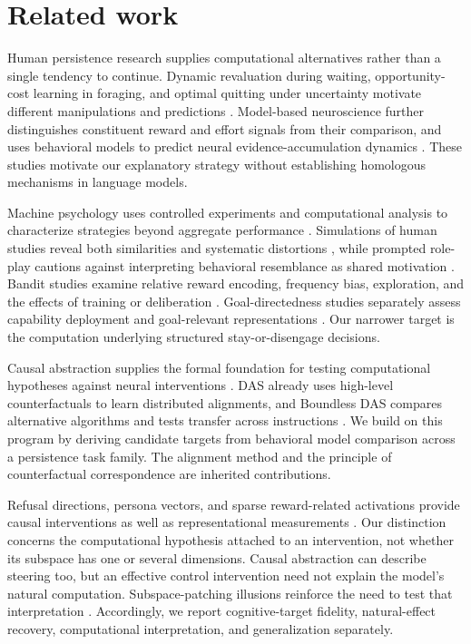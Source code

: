 \documentclass{article}
\begin{document}
\section{Related work}
Human persistence research supplies computational alternatives rather than a single tendency to continue. Dynamic revaluation during waiting, opportunity-cost learning in foraging, and optimal quitting under uncertainty motivate different manipulations and predictions \citep{mcguire2015persistence,constantino2015foraging,sukhov2025quitting}. Model-based neuroscience further distinguishes constituent reward and effort signals from their comparison, and uses behavioral models to predict neural evidence-accumulation dynamics \citep{klein2016comparison,pisauro2017evidence}. These studies motivate our explanatory strategy without establishing homologous mechanisms in language models.

Machine psychology uses controlled experiments and computational analysis to characterize strategies beyond aggregate performance \citep{hagendorff2024machine,binz2023psychology}. Simulations of human studies reveal both similarities and systematic distortions \citep{aher2023simulate}, while prompted role-play cautions against interpreting behavioral resemblance as shared motivation \citep{shanahan2023roleplay}. Bandit studies examine relative reward encoding, frequency bias, exploration, and the effects of training or deliberation \citep{hayes2024biased,schmied2025greedy,chen2025greedy,zhang2026exploration}. Goal-directedness studies separately assess capability deployment and goal-relevant representations \citep{everitt2025goals,arghal2026goals}. Our narrower target is the computation underlying structured stay-or-disengage decisions.

Causal abstraction supplies the formal foundation for testing computational hypotheses against neural interventions \citep{geiger2025foundation}. DAS already uses high-level counterfactuals to learn distributed alignments, and Boundless DAS compares alternative algorithms and tests transfer across instructions \citep{geiger2024alignments,wu2023scale}. We build on this program by deriving candidate targets from behavioral model comparison across a persistence task family. The alignment method and the principle of counterfactual correspondence are inherited contributions.

Refusal directions, persona vectors, and sparse reward-related activations provide causal interventions as well as representational measurements \citep{arditi2024refusal,chen2025persona,xu2026reward}. Our distinction concerns the computational hypothesis attached to an intervention, not whether its subspace has one or several dimensions. Causal abstraction can describe steering too, but an effective control intervention need not explain the model's natural computation. Subspace-patching illusions reinforce the need to test that interpretation \citep{makelov2024illusion}. Accordingly, we report cognitive-target fidelity, natural-effect recovery, computational interpretation, and generalization separately.
\end{document}
